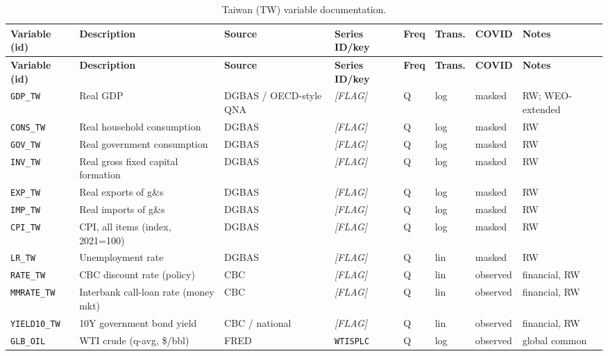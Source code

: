 {\footnotesize
\begin{longtable}{p{2.3cm}p{3.3cm}p{2.1cm}p{2.2cm}p{0.6cm}p{1.4cm}p{1.9cm}p{2.4cm}}
\caption{Taiwan (TW) variable documentation.}\label{tab:data:TW}\\
\toprule
\textbf{Variable (id)} & \textbf{Description} & \textbf{Source} & \textbf{Series ID/key} & \textbf{Freq} & \textbf{Trans.} & \textbf{COVID} & \textbf{Notes} \\
\midrule
\endfirsthead
\toprule
\textbf{Variable (id)} & \textbf{Description} & \textbf{Source} & \textbf{Series ID/key} & \textbf{Freq} & \textbf{Trans.} & \textbf{COVID} & \textbf{Notes} \\
\midrule
\endhead
\bottomrule
\endfoot
\texttt{GDP\_TW}    & Real GDP                           & DGBAS / OECD-style QNA & \textit{[FLAG]} & Q & log & masked & RW; WEO-extended \\
\texttt{CONS\_TW}   & Real household consumption         & DGBAS & \textit{[FLAG]} & Q & log & masked & RW \\
\texttt{GOV\_TW}    & Real government consumption        & DGBAS & \textit{[FLAG]} & Q & log & masked & RW \\
\texttt{INV\_TW}    & Real gross fixed capital formation & DGBAS & \textit{[FLAG]} & Q & log & masked & RW \\
\texttt{EXP\_TW}    & Real exports of g\&s               & DGBAS & \textit{[FLAG]} & Q & log & masked & RW \\
\texttt{IMP\_TW}    & Real imports of g\&s               & DGBAS & \textit{[FLAG]} & Q & log & masked & RW \\
\texttt{CPI\_TW}    & CPI, all items (index, 2021=100)   & DGBAS & \textit{[FLAG]} & Q & log & masked & RW \\
\texttt{LR\_TW}     & Unemployment rate                  & DGBAS & \textit{[FLAG]} & Q & lin & masked & RW \\
\texttt{RATE\_TW}   & CBC discount rate (policy)         & CBC & \textit{[FLAG]} & Q & lin & observed & financial, RW \\
\texttt{MMRATE\_TW} & Interbank call-loan rate (money mkt) & CBC & \textit{[FLAG]} & Q & lin & observed & financial, RW \\
\texttt{YIELD10\_TW}& 10Y government bond yield          & CBC / national & \textit{[FLAG]} & Q & lin & observed & financial, RW \\
\texttt{GLB\_OIL}   & WTI crude (q-avg, \$/bbl)          & FRED & \texttt{WTISPLC} & Q & log & observed & global common \\

\end{longtable}}
